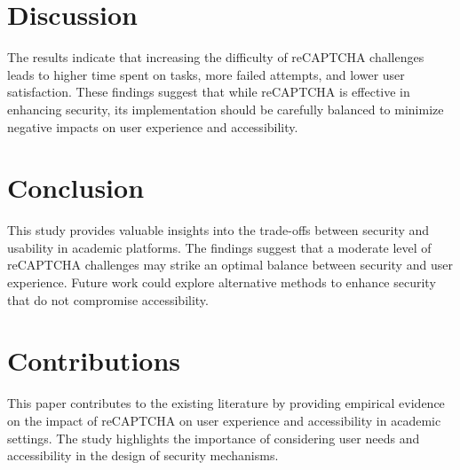 \documentclass{article}
\begin{document}
\section{Discussion}
The results indicate that increasing the difficulty of reCAPTCHA challenges leads to higher time spent on tasks, more failed attempts, and lower user satisfaction. These findings suggest that while reCAPTCHA is effective in enhancing security, its implementation should be carefully balanced to minimize negative impacts on user experience and accessibility.

\section{Conclusion}
This study provides valuable insights into the trade-offs between security and usability in academic platforms. The findings suggest that a moderate level of reCAPTCHA challenges may strike an optimal balance between security and user experience. Future work could explore alternative methods to enhance security that do not compromise accessibility.

\section{Contributions}
This paper contributes to the existing literature by providing empirical evidence on the impact of reCAPTCHA on user experience and accessibility in academic settings. The study highlights the importance of considering user needs and accessibility in the design of security mechanisms.
\end{document}
